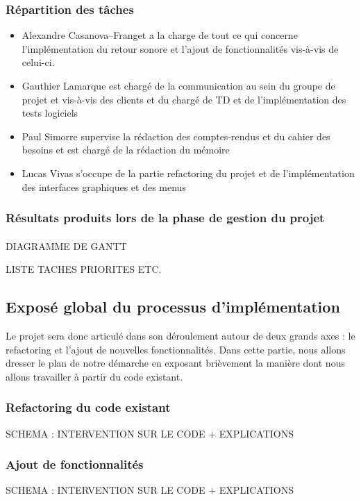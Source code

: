 \subsubsection{Répartition des tâches}
\begin{itemize}
\item Alexandre Casanova--Franget a la charge de tout ce qui concerne l'implémentation du retour sonore et l'ajout de fonctionnalités vis-à-vis de celui-ci.
\item Gauthier Lamarque est chargé de la communication au sein du groupe de projet et vis-à-vis des clients et du chargé de TD et de l'implémentation des tests logiciels
\item Paul Simorre supervise la rédaction des comptes-rendus et du cahier des besoins et est chargé de la rédaction du mémoire
\item Lucas Vivas s'occupe de la partie refactoring du projet et de l'implémentation des interfaces graphiques et des menus
\end{itemize}

\subsubsection{Résultats produits lors de la phase de gestion du projet}
\paragraph{}

DIAGRAMME DE GANTT

LISTE TACHES PRIORITES ETC.


\subsection{Exposé global du processus d'implémentation}
Le projet sera donc articulé dans son déroulement autour de deux
grands axes : le refactoring et l'ajout de nouvelles
fonctionnalités. Dans cette partie, nous allons dresser le plan de
notre démarche en exposant brièvement la manière dont nous allons
travailler à partir du code existant.

\subsubsection{Refactoring du code existant}

SCHEMA : INTERVENTION SUR LE CODE + EXPLICATIONS


\subsubsection{Ajout de fonctionnalités}

SCHEMA : INTERVENTION SUR LE CODE + EXPLICATIONS
